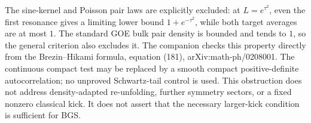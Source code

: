The sine-kernel and Poisson pair laws are explicitly excluded: at
$L=e^{\tau^2}$, even the first resonance gives a limiting lower bound
$1+e^{-\tau^2}$, while both target averages are at most $1$. The standard
GOE bulk pair density is bounded and tends to $1$, so the general criterion
also excludes it. The companion checks this property directly from the
Brezin--Hikami formula, equation (181), arXiv:math-ph/0208001.
The continuous compact test may be replaced by a smooth compact
positive-definite autocorrelation; no unproved Schwartz-tail control is used.
This obstruction does not address density-adapted re-unfolding, further
symmetry sectors, or a fixed nonzero classical kick. It does not assert
that the necessary larger-kick condition is sufficient for BGS.
